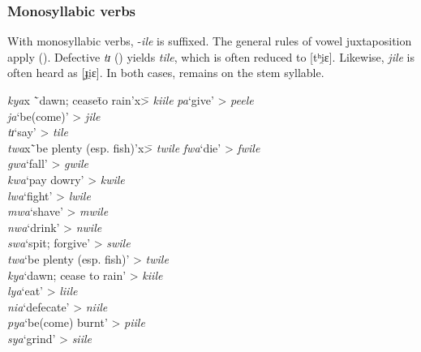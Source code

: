 \subsubsection{Monosyllabic verbs}
With monosyllabic verbs, -\textit{ile} is suffixed. The general rules of vowel juxtaposition apply (). Defective \textit{tɪ} () yields \textit{tile}, which is often reduced to [tʰi̯ɛ]. Likewise, \textit{jile} is often heard as [ɟi̯ɛ]. In both cases,  remains on the stem syllable.
\begin{exe}
\ex
\begin{tabbing}
\textit{kya}x \=`dawn; cease\= to rain'x\= > \textit{kiile}\kill
\textit{pa}\>`give'\> > \textit{peele}\\
\textit{ja}\>`be(come)'\> > \textit{jile}\\
\textit{tɪ}\>`say'\> > \textit{tile} \\
\textit{twa}x\=`be plenty (esp. fish)'x\= > \textit{twile}\kill %
\textit{fwa}\>`die'\> > \textit{fwile} \\
\textit{gwa}\>`fall'\> > \textit{gwile} \\
\textit{kwa}\>`pay dowry'\> > \textit{kwile} \\%
\textit{lwa}\>`fight'\>\> > \textit{lwile} \\ 
\textit{mwa}\>`shave'\>\> > \textit{mwile} \\
\textit{nwa}\>`drink'\>\> > \textit{nwile} \\
\textit{swa}\>`spit; forgive'\>\> > \textit{swile} \\
\textit{twa}\>`be plenty (esp. fish)'\>\> > \textit{twile}\\
\textit{kya}\>`dawn; cease to rain'\>\> > \textit{kiile}\\
\textit{lya}\>`eat'\> > \textit{liile} \\
\textit{nia}\>`defecate'\> > \textit{niile} \\
\textit{pya}\>`be(come) burnt'\> > \textit{piile}\\
\textit{sya}\>`grind'\> > \textit{siile}
\end{tabbing}
\end{exe}

